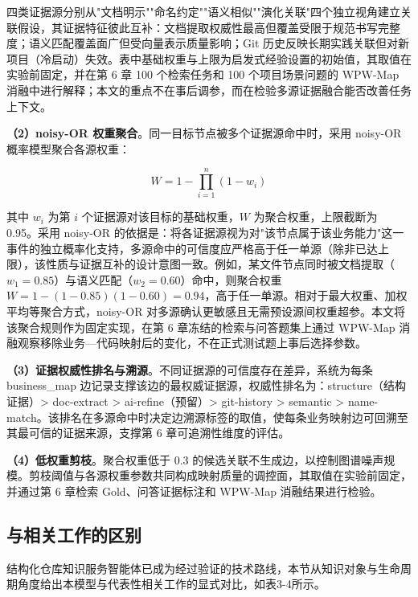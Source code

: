 四类证据源分别从"文档明示""命名约定""语义相似""演化关联"四个独立视角建立关联假设，其证据特征彼此互补：文档提取权威性最高但覆盖受限于规范书写完整度；语义匹配覆盖面广但受向量表示质量影响；Git 历史反映长期实践关联但对新项目（冷启动）失效。表中基础权重与上限为启发式经验设置的初始值，其取值在实验前固定，并在第 6 章 100 个检索任务和 100 个项目场景问题的 WPW-Map 消融中进行解释；本文的重点不在事后调参，而在检验多源证据融合能否改善任务上下文。

\textbf{（2）noisy-OR 权重聚合}。同一目标节点被多个证据源命中时，采用 noisy-OR 概率模型聚合各源权重：

\begin{equation}
W = 1 - \prod_{i=1}^{n}(1 - w_i) \tag{3-1}
\end{equation}

其中 $w_i$ 为第 $i$ 个证据源对该目标的基础权重，$W$ 为聚合权重，上限截断为 0.95。采用 noisy-OR 的依据是：将各证据源视为对"该节点属于该业务能力"这一事件的独立概率化支持，多源命中的可信度应严格高于任一单源（除非已达上限），该性质与证据互补的设计意图一致。例如，某文件节点同时被文档提取（$w_1=0.85$）与语义匹配（$w_2=0.60$）命中，则聚合权重 $W = 1-(1-0.85)(1-0.60) = 0.94$，高于任一单源。相对于最大权重、加权平均等聚合方式，noisy-OR 对多源确认更敏感且无需预设源间权重超参。本文将该聚合规则作为固定实现，在第 6 章冻结的检索与问答题集上通过 WPW-Map 消融观察移除业务—代码映射后的变化，不在正式测试题上事后选择参数。

\textbf{（3）证据权威性排名与溯源}。不同证据源的可信度存在差异，系统为每条 business\_map 边记录支撑该边的最权威证据源，权威性排名为：structure（结构证据）> doc-extract > ai-refine（预留）> git-history > semantic > name-match。该排名在多源命中时决定边溯源标签的取值，使每条业务映射边可回溯至其最可信的证据来源，支撑第 6 章可追溯性维度的评估。

\textbf{（4）低权重剪枝}。聚合权重低于 0.3 的候选关联不生成边，以控制图谱噪声规模。剪枝阈值与各源权重参数共同构成映射质量的调控面，其取值在实验前固定，并通过第 6 章检索 Gold、问答证据标注和 WPW-Map 消融结果进行检验。


\subsection{与相关工作的区别}
结构化仓库知识服务智能体已成为经过验证的技术路线，本节从知识对象与生命周期角度给出本模型与代表性相关工作的显式对比，如表3-4所示。

